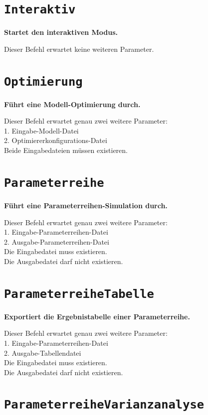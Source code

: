 \section{\texttt{Interaktiv}}

\textbf{Startet den interaktiven Modus.}

Dieser Befehl erwartet keine weiteren Parameter.

\section{\texttt{Optimierung}}

\textbf{Führt eine Modell-Optimierung durch.}

Dieser Befehl erwartet genau zwei weitere Parameter:\\
1. Eingabe-Modell-Datei\\
2. Optimiererkonfigurations-Datei\\
Beide Eingabedateien müssen existieren.

\section{\texttt{Parameterreihe}}

\textbf{Führt eine Parameterreihen-Simulation durch.}

Dieser Befehl erwartet genau zwei weitere Parameter:\\
1. Eingabe-Parameterreihen-Datei\\
2. Ausgabe-Parameterreihen-Datei\\
Die Eingabedatei muss existieren.\\
Die Ausgabedatei darf nicht existieren.

\section{\texttt{ParameterreiheTabelle}}

\textbf{Exportiert die Ergebnistabelle einer Parameterreihe.}

Dieser Befehl erwartet genau zwei weitere Parameter:\\
1. Eingabe-Parameterreihen-Datei\\
2. Ausgabe-Tabellendatei\\
Die Eingabedatei muss existieren.\\
Die Ausgabedatei darf nicht existieren.

\section{\texttt{ParameterreiheVarianzanalyse}}

